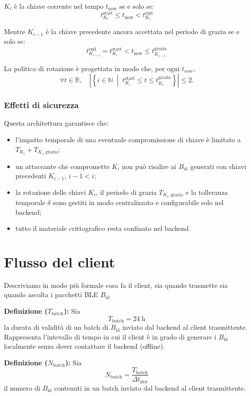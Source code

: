 \documentclass[a4paper,11pt]{article}
\begin{document}
$K_i$ è la chiave corrente nel tempo \(t_{\text{now}}\) se e solo se:
\[
  t_{K_i}^{\text{start}} \leq t_{\text{now}} < t_{K_i}^{\text{end}}
\]


Mentre $K_{i-1}$ è la chiave precedente ancora accettata nel periodo di grazia se e solo se:
\[
  t_{K_{i-1}}^{\text{end}} = t_{K_i}^{\text{start}} < t_{\text{now}} \leq t_{K_{i-1}}^{\text{grazia}}
\]

La politica di rotazione è progettata in modo che, per ogni $t_{now}$,
\[
  \forall t \in \mathbb{R}, \quad
  \left|
  \left\{
  i \in \mathbb{N}
  \;\middle|\;
  t_{K_i}^{\text{start}} \le t \le t_{K_i}^{\text{grazia}}
  \right\}
  \right| \le 2.
\]

\subsubsection{Effetti di sicurezza}
Questa architettura garantisce che:
\begin{itemize}
  \item l'impatto temporale di una eventuale compromissione di chiave è limitato a \(T_{K_i} + T_{K_i,\mathrm{grazia}}\);
  \item un attaccante che compromette \(K_i\) non può risalire ai \(B_{\text{id}}\) generati con chiavi precedenti \(K_{i-1}\), \(i-1 < i\);
  \item la rotazione delle chiavi \(K_i\), il periodo di grazia \(T_{K_i,\mathrm{grazia}}\) e la tolleranza temporale \(\delta\) sono gestiti in modo centralizzato e configurabile solo nel backend;
  \item tutto il materiale crittografico resta confinato nel backend.
\end{itemize}

\section{Flusso del client}
Descriviamo in modo più formale cosa fa il client, sia quando trasmette sia quando ascolta i pacchetti BLE \(B_{\text{id}}\)

\textbf{Definizione (\(T_{\text{batch}}\)):} Sia
\[
  T_{\text{batch}} = \SI{24}{\hour}
\]
la durata di validità di un batch di \(B_{\text{id}}\) inviato dal backend al client trasmittente.
Rappresenta l'intevallo di tempo in cui il client è in grado di generare i \(B_{\text{id}}\) localmente senza dover contattare il backend (offline).

\textbf{Definizione (\(N_{\text{batch}}\)):} Sia
\[
  N_{\text{batch}} = \frac{T_{\text{batch}}}{\Delta t_{\text{slot}}}
\]
il numero di \(B_{\text{id}}\) contenuti in un batch inviato dal backend al client trasmittente.
\end{document}
